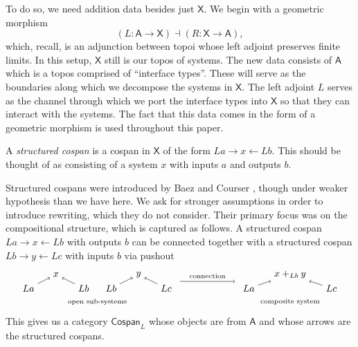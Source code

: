 \documentclass{amsart}
\newcommand{\A}{\cat{A}}
\newcommand{\X}{\cat{X}}
\newcommand{\Csp}{\cat{Cospan}}
\newcommand{\cat}[1]{\mathsf{#1}}
\newcommand{\from}{\colon}
\renewcommand{\gets}{\leftarrow}
\theoremstyle{remark}
\theoremstyle{definition}
\begin{document}
To do so, we need addition data besides just $ \X $.  We begin with a
geometric morphism
%
\[
  ( L \from \A \to \X ) \dashv ( R \from \X \to \A ),
\]
% 
which, recall, is an adjunction between topoi whose left adjoint preserves finite
limits.  In this setup, $ \X $ still is our topos of systems.  The new
data consists of $ \A $ which is a topos comprised of ``interface
types''.  These will serve as the boundaries along which we decompose
the systems in $ \X $.  The left adjoint $ L $ serves as the channel
through which we port the interface types into $ \X $ so that they can
interact with the systems.  The fact that this data comes in the form
of a geometric morphism is used throughout this paper.

A \emph{structured cospan} is a cospan in $ \X $ of the form
$ La \to x \gets Lb $. This should be thought of as consisting of a
system $ x $ with inputs $ a $ and outputs $ b $.

Structured cospans were introduced by Baez and Courser
\cite{courser-strcsp}, though under weaker hypothesis than we have here.
We ask for stronger assumptions in order to introduce rewriting, which
they do not consider.  Their primary focus was on the compositional
structure, which is captured as follows. A structured cospan
$ La \to x \gets Lb $ with outputs $ b $ can be connected together
with a structured cospan $ Lb \to y \gets Lc $ with inputs $ b $ via
pushout
%
\[
  \begin{tikzpicture}
    \begin{scope}
      \node (1) at (0,0) {$ La $};
      \node (2) at (1,0.5) {$ x $};
      \node (3) at (2,0) {$ Lb $};
      \node (4) at (3,0) {$ Lb $};
      \node (5) at (4,0.5) {$ y $};
      \node (6) at (5,0) {$ Lc $};
      \draw [->] (1) to node [] {\scriptsize{$  $}} (2);
      \draw [->] (3) to node [] {\scriptsize{$  $}} (2);
      \draw [->] (4) to node [] {\scriptsize{$  $}} (5);
      \draw [->] (6) to node [] {\scriptsize{$  $}} (5);
      \node () at (2.5,-0.5) {\scriptsize{open sub-systems}};
    \end{scope}
    \begin{scope}[shift={(8,0)}]
      \node (1) at (0,0) {$ La $};
      \node (2) at (1.5,0.5) {$ x +_{Lb} y $};
      \node (3) at (3,0) {$ Lc $};
      \draw [->] (1) to node [] {\scriptsize{$  $}} (2);
      \draw [->] (3) to node [] {\scriptsize{$  $}} (2);
      \node () at (1.5,-0.5) {\scriptsize{composite system}};
    \end{scope}
    \draw [->] (5.5,0.25) to node [above] {\scriptsize{connection}} (7.5,0.25);    
  \end{tikzpicture}
\]
% 
This gives us a category $ \Csp_L $ whose objects are from $ \A $ and
whose arrows are the structured cospans. 
\end{document}
